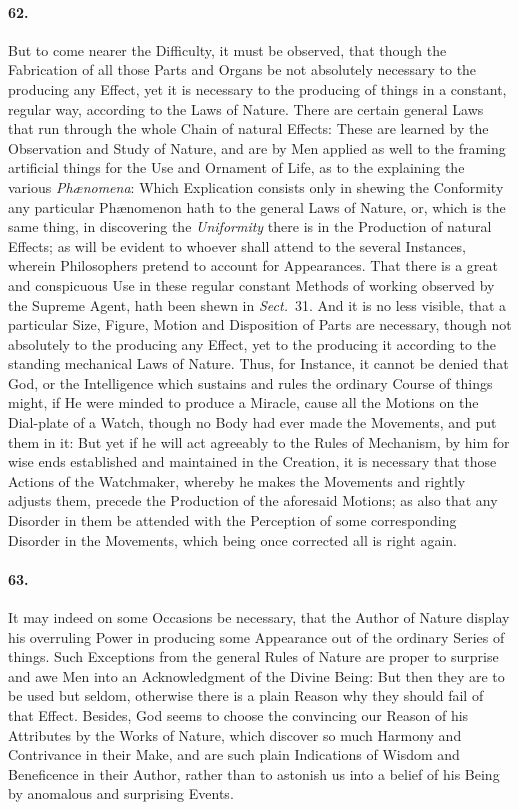 \documentclass[]{article}
\newenvironment{sectionbody}{}{}
\begin{document}
\begin{sectionbody}
\paragraph{62.} But to come nearer the Difficulty, it must be observed, that
though the Fabrication of all those Parts and Organs be not
absolutely necessary to the producing any Effect, yet it is
necessary to the producing of things in a constant, regular way,
according to the Laws of Nature.  There are certain general Laws
that run through the whole Chain of natural Effects: These are
learned by the Observation and Study of Nature, and are by Men
applied as well to the framing artificial things for the Use and
Ornament of Life, as to the explaining the various
\emph{Ph{\ae}nomena}: Which Explication consists only in
shewing the Conformity any particular Ph{\ae}nomenon hath to
the general Laws of Nature, or, which is the same thing, in
discovering the \emph{Uniformity} there is in the Production of
natural Effects; as will be evident to whoever shall attend to
the several Instances, wherein Philosophers pretend to account
for Appearances.  That there is a great and conspicuous Use in
these regular constant Methods of working observed by the Supreme
Agent, hath been shewn in \emph{Sect.}~31.
And it is no less visible, that a particular Size, Figure, Motion
and Disposition of Parts are necessary, though not absolutely to
the producing any Effect, yet to the producing it according to
the standing mechanical Laws of Nature.  Thus, for Instance, it
cannot be denied that God, or the Intelligence which sustains and
rules the ordinary Course of things might, if He were minded to
produce a Miracle, cause all the Motions on the Dial-plate of a
Watch, though no Body had ever made the Movements, and put them
in it: But yet if he will act agreeably to the Rules of
Mechanism, by him for wise ends established and maintained in the
Creation, it is necessary that those Actions of the Watchmaker,
whereby he makes the Movements and rightly adjusts them, precede
the Production of the aforesaid Motions; as also that any
Disorder in them be attended with the Perception of some
corresponding Disorder in the Movements, which being once
corrected all is right again.



\paragraph{63.} It may indeed on some Occasions be necessary, that the Author of
Nature display his overruling Power in producing some Appearance
out of the ordinary Series of things.  Such Exceptions from the
general Rules of Nature are proper to surprise and awe Men into
an Acknowledgment of the Divine Being: But then they are to be
used but seldom, otherwise there is a plain Reason why they
should fail of that Effect.  Besides, God seems to choose the
convincing our Reason of his Attributes by the Works of Nature,
which discover so much Harmony and Contrivance in their Make, and
are such plain Indications of Wisdom and Beneficence in their
Author, rather than to astonish us into a belief of his Being by
anomalous and surprising Events.




\end{sectionbody}
\end{document}
